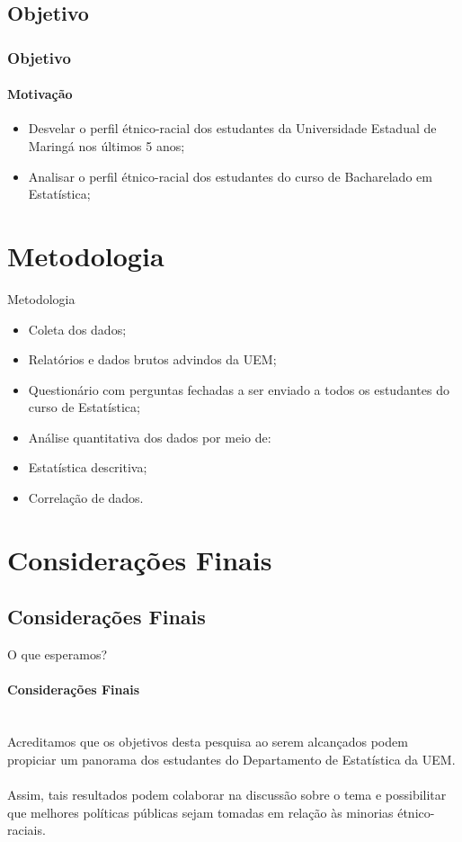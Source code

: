 \documentclass{beamer}
\begin{document}
\subsection{Objetivo}

\begin{frame}
    \frametitle{Objetivo}
    \framesubtitle{Motivação}
    \justifying
    \begin{itemize}
        \item Desvelar o perfil étnico-racial dos estudantes da Universidade Estadual de Maringá nos últimos 5 anos;
        \item Analisar o perfil étnico-racial dos estudantes do curso de Bacharelado em Estatística;
    \end{itemize}

\end{frame}

\section{Metodologia}
\begin{frame}{Metodologia}

           \begin{itemize}
    \item Coleta dos dados;
           \item Relatórios e dados brutos advindos da UEM;
            \item Questionário com perguntas fechadas a ser enviado a todos os estudantes do curso de Estatística;
              \end{itemize}
\begin{itemize}

    \item Análise quantitativa dos dados por meio de:
        \item  Estatística descritiva;
        \item  Correlação de dados.

\end{itemize}

\end{frame}

\section{Considerações Finais}
\subsection{Considerações Finais}
\begin{frame}{O que esperamos?}
\framesubtitle{Considerações Finais}
    \justifying
  \\
Acreditamos que os objetivos desta pesquisa ao serem alcançados podem propiciar um panorama dos estudantes do Departamento de Estatística da UEM.\\
\\Assim, tais resultados podem colaborar na discussão sobre o tema e possibilitar que melhores políticas públicas sejam tomadas em relação às minorias étnico-raciais.

\end{frame}
\end{document}
